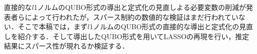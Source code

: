 \documentclass[technicalreport]{ieicej}
\begin{document}
直接的な$l$1ノルムのQUBO形式の導出と定式化の見直しよる必要変数の削減\cite{l1-norm}が発表者らによって行われたが，スパース制約の数値的な検証はまだ行われていない．そこで本稿では，まず$l$1ノルムのQUBO形式の直接的な導出と定式化の見直しを紹介する．そして導出したQUBO形式を用いてLASSOの再現を行い，推定結果にスパース性が現れるか検証する．




%
%
\begin{thebibliography}{99}%
\bibitem{}
\end{thebibliography}
\end{document}

